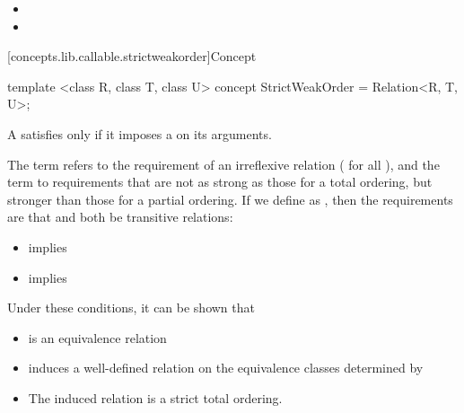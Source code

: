 \begin{addedblock}
\begin{itemdescr}
\begin{itemize}
\item {}
\item {}
\end{itemize}
\end{itemdescr}

[concepts.lib.callable.strictweakorder]{Concept }

%
\begin{itemdecl}
template <class R, class T, class U>
concept StrictWeakOrder = Relation<R, T, U>;
\end{itemdecl}

\begin{itemdescr}
\pnum
A  satisfies  only if
it imposes a  on its arguments.

\pnum
The term
refers to the
requirement of an irreflexive relation ( for all ),
and the term
to requirements that are not as strong as
those for a total ordering,
but stronger than those for a partial
ordering.
If we define
as
,
then the requirements are that
and
both be transitive relations:

\begin{itemize}
\item
{}
implies
\item
{}
implies
\end{itemize}

\pnum
\enternote
Under these conditions, it can be shown that
\begin{itemize}
\item
{}
is an equivalence relation
\item
{}
induces a well-defined relation on the equivalence
classes determined by
\item
The induced relation is a strict total ordering.
\exitnote
\end{itemize}
\end{itemdescr}
\end{addedblock}
